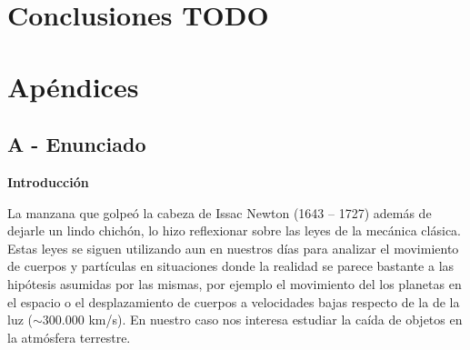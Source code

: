\documentclass[a4paper]{article}
\begin{document}
 

\section{Conclusiones TODO}

\newpage

\section{Apéndices}
\subsection{A - Enunciado}
{\bf Introducción}

La manzana que golpeó la cabeza de Issac Newton (1643 -- 1727) además de dejarle un lindo chichón, lo hizo reflexionar sobre las leyes de la mecánica clásica. Estas leyes se siguen utilizando aun en nuestros días para analizar el movimiento de cuerpos y partículas en situaciones donde la realidad se parece bastante a las hipótesis asumidas por las mismas, por ejemplo el movimiento del los planetas en el espacio o el desplazamiento de cuerpos a velocidades bajas respecto de la de la luz ($\sim 300.000$ km/s). En nuestro caso nos interesa estudiar la caída de objetos en la atmósfera terrestre.
\end{document}
